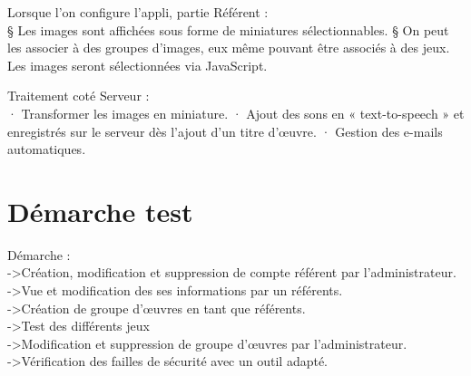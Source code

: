 \documentclass[12pt,a4paper]{report}
\begin{document}
Lorsque l’on configure l’appli, partie Référent :\\
§  Les images sont affichées sous forme de miniatures sélectionnables.
§  On peut les associer à des groupes d’images, eux même pouvant être associés à des jeux. Les images seront sélectionnées via JavaScript.
 
Traitement coté Serveur :\\
·         Transformer les images en miniature.
·         Ajout des sons en « text-to-speech » et enregistrés sur le serveur dès l’ajout d’un titre d’œuvre.
·         Gestion des e-mails automatiques.

\chapter{Démarche test}
Démarche : \\
->Création, modification et suppression de compte référent par l'administrateur.\\
->Vue et modification des ses informations par un référents.\\
->Création de groupe d'œuvres en tant que référents. \\
->Test des différents jeux\\
->Modification et suppression de groupe d'œuvres par l'administrateur.\\
->Vérification des failles de sécurité avec un outil adapté.
\end{document}
